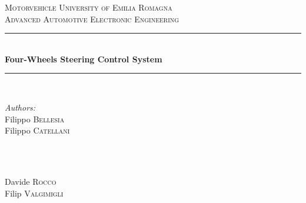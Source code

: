 
\begin{titlepage}

\newcommand{\HRule}{\rule{\linewidth}{0.5mm}} %

\center %
 

\textsc{\LARGE Motorvehicle University of Emilia Romagna}\\[1.35 cm] %
\textsc{\Large Advanced Automotive Electronic Engineering}\\[0.5cm] %


\HRule \\[0.4cm]
{ \huge \bfseries Four-Wheels Steering Control System}\\[0.4cm] %
\HRule \\[1.5cm]
 

\begin{minipage}{0.4\textwidth}
\begin{flushleft} \large
\emph{Authors:}\\
Filippo \textsc{Bellesia} \\

Filippo \textsc{Catellani}  \\

\end{flushleft}
\end{minipage}
~
\begin{minipage}{0.4\textwidth}
	\begin{flushright} \large
	\emph{}\\	
Davide \textsc{Rocco} \\

Filip \textsc{Valgimigli}  \\	


\end{flushright}
\end{minipage}
\end{titlepage}
